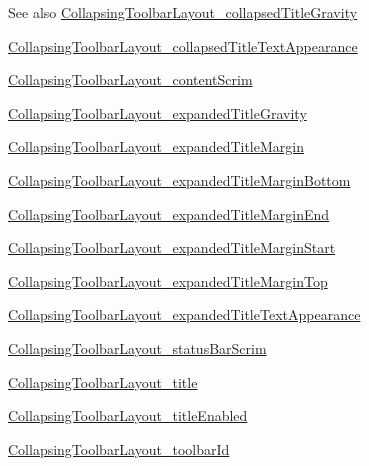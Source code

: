 \begin{DoxySeeAlso}{See also}
\hyperlink{classcheck_1_1test_1_1_r_1_1styleable_ad728b1cdc0cf8cb71ec337342515dd75}{Collapsing\+Toolbar\+Layout\+\_\+collapsed\+Title\+Gravity} 

\hyperlink{classcheck_1_1test_1_1_r_1_1styleable_af8c6af1685175b4f7441abd8ac238f71}{Collapsing\+Toolbar\+Layout\+\_\+collapsed\+Title\+Text\+Appearance} 

\hyperlink{classcheck_1_1test_1_1_r_1_1styleable_aafa0dc99209d496d21b18f2db67597f1}{Collapsing\+Toolbar\+Layout\+\_\+content\+Scrim} 

\hyperlink{classcheck_1_1test_1_1_r_1_1styleable_a111ed46d59211ccdd56c892aa2be9eb6}{Collapsing\+Toolbar\+Layout\+\_\+expanded\+Title\+Gravity} 

\hyperlink{classcheck_1_1test_1_1_r_1_1styleable_ab6768f81043a9099ccaa6b71b1e063b7}{Collapsing\+Toolbar\+Layout\+\_\+expanded\+Title\+Margin} 

\hyperlink{classcheck_1_1test_1_1_r_1_1styleable_afd2cccb26f6d0c7f231c62cd008c5963}{Collapsing\+Toolbar\+Layout\+\_\+expanded\+Title\+Margin\+Bottom} 

\hyperlink{classcheck_1_1test_1_1_r_1_1styleable_a7c45bb4250b94c50e63037e285cbce79}{Collapsing\+Toolbar\+Layout\+\_\+expanded\+Title\+Margin\+End} 

\hyperlink{classcheck_1_1test_1_1_r_1_1styleable_a9998f98d1bc4ccd614b3102b27346107}{Collapsing\+Toolbar\+Layout\+\_\+expanded\+Title\+Margin\+Start} 

\hyperlink{classcheck_1_1test_1_1_r_1_1styleable_a33f7e13e75737dc7d53feb23164abfcf}{Collapsing\+Toolbar\+Layout\+\_\+expanded\+Title\+Margin\+Top} 

\hyperlink{classcheck_1_1test_1_1_r_1_1styleable_a01bf5ec327b8ed9194b323abcf3f914c}{Collapsing\+Toolbar\+Layout\+\_\+expanded\+Title\+Text\+Appearance} 

\hyperlink{classcheck_1_1test_1_1_r_1_1styleable_a2475ffb2f49d975dd9c976b973c3385f}{Collapsing\+Toolbar\+Layout\+\_\+status\+Bar\+Scrim} 

\hyperlink{classcheck_1_1test_1_1_r_1_1styleable_af9921604bea0ce807ca10fd495eb7f48}{Collapsing\+Toolbar\+Layout\+\_\+title} 

\hyperlink{classcheck_1_1test_1_1_r_1_1styleable_ab762976306f550b00c8cb1c7ed31cd44}{Collapsing\+Toolbar\+Layout\+\_\+title\+Enabled} 

\hyperlink{classcheck_1_1test_1_1_r_1_1styleable_ab00225a14bdf82c12e0532781e9bb655}{Collapsing\+Toolbar\+Layout\+\_\+toolbar\+Id} 
\end{DoxySeeAlso}
\hypertarget{classcheck_1_1test_1_1_r_1_1styleable_ad728b1cdc0cf8cb71ec337342515dd75}{}
